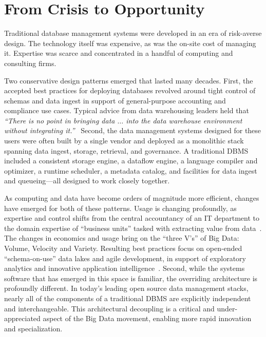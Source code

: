 \documentclass{sig-alternate}
\begin{document}
\section{From Crisis to Opportunity}
Traditional database management systems were developed in an era of risk-averse design.
The technology itself was expensive, as was the on-site cost of managing it. Expertise
was scarce and concentrated in a handful of computing and consulting firms.

Two conservative design patterns emerged that lasted many decades. First, the accepted best practices
for deploying databases revolved around tight control of schemas and data ingest in support of 
general-purpose accounting and compliance use cases. 
Typical advice from data
warehousing leaders held that 
\emph{``There is no point in 
bringing data $\ldots$ into the data warehouse environment without integrating it.''}~\cite{inmon2005building} 
Second, 
the data management systems designed for these users were often built by a single vendor and deployed as a
monolithic stack spanning data ingest, storage, retrieval, and governance.
A traditional DBMS included a consistent storage engine, a dataflow engine, 
a language compiler and optimizer, a runtime scheduler, a metadata catalog, and facilities for data ingest 
and queueing---all designed to work closely together.


As computing and data have become orders of magnitude more efficient, changes have emerged for both of these patterns. 
Usage is changing profoundly, as expertise and control shifts from the central accountancy of an IT department to 
the domain expertise of ``business units'' tasked with extracting value from data~\cite{gartner}. 
The changes in economics and usage bring on the ``three V's'' of Big Data: Volume, Velocity and Variety.
Resulting best practices focus on open-ended ``schema-on-use''
data lakes and agile development, in support of exploratory analytics and innovative application intelligence~\cite{patil2012data}. 
Second, while the systems software that has emerged in this space is familiar, the overriding architecture is profoundly 
different. In today's leading open source
data management stacks, nearly all of the components 
of a traditional DBMS are explicitly independent 
and interchangeable.  This architectural decoupling is 
a critical and under-appreciated aspect of the Big Data movement,
enabling more rapid innovation and specialization.
\end{document}
